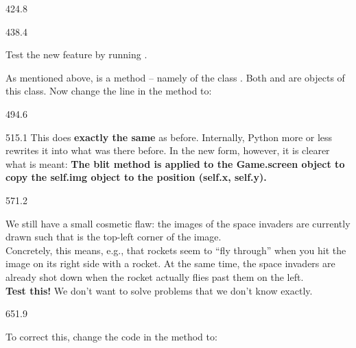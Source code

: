 \documentclass{aslab}
\begin{document}
\begin{region}{424.8}
\end{region}

\begin{region}[pitch=13.5]{438.4}
\begin{plaintasks}
\item Test the new feature by running .
\item As mentioned above,  is a method -- namely of the class
  . Both  and  are
  objects of this class. Now change the line in the  method to:
\end{plaintasks}
\end{region}

\begin{region}[x=74.7,right=0]{494.6}
\end{region}

\begin{region}[x=74.7,right=0,pitch=14.27]{515.1}
This does \textbf{exactly the same} as before. Internally, Python more or
less rewrites it into what was there before. In the new form, however, it is
clearer what is meant: \textbf{The blit method is applied to the Game.screen
object to copy the self.img object to the position (self.x, self.y).}
\end{region}

\begin{region}[pitch=13.44]{571.2}
\begin{plaintasks}[start=3]
\item We still have a small cosmetic flaw: the images of the space invaders
  are currently drawn such that  is the top-left
  corner of the image.\\
  Concretely, this means, e.g., that rockets seem to ``fly through'' when
  you hit the image on its right side with a rocket. At the same time, the
  space invaders are already shot down when the rocket actually flies past
  them on the left.\\
  \textbf{Test this!} We don't want to solve problems that we don't know
  exactly.
\end{plaintasks}
\end{region}

\begin{region}[pitch=13.2]{651.9}
\begin{plaintasks}[start=4]
\item To correct this, change the code in the  method to:
\end{plaintasks}
\end{region}
\end{document}
